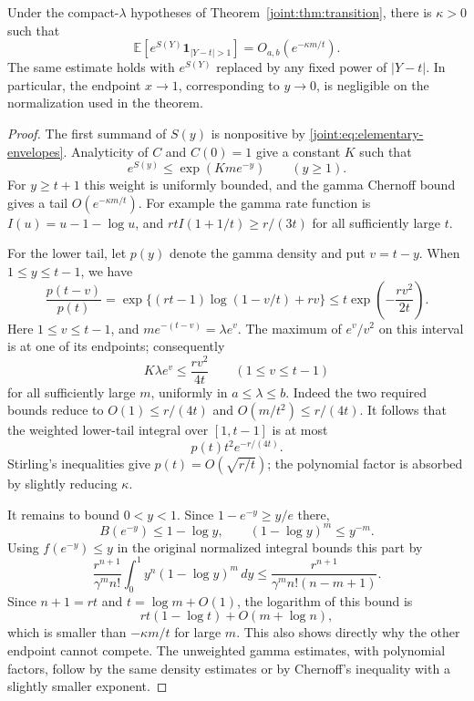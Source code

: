 \begin{lemma}\label{joint:lem:localization}
Under the compact-$\lambda$ hypotheses of
Theorem~\ref{joint:thm:transition}, there is $\kappa>0$ such that
\begin{equation}\label{joint:eq:localization}
 \mathbb E\left[e^{S(Y)}\mathbf1_{|Y-t|>1}\right]
       =O_{a,b}\left(e^{-\kappa m/t}\right).
\end{equation}
The same estimate holds with $e^{S(Y)}$ replaced by any fixed power
of $|Y-t|$. In particular, the endpoint $x\to1$, corresponding to
$y\to0$, is negligible on the normalization used in the theorem.
\end{lemma}
\begin{proof}
The first summand of $S(y)$ is nonpositive by
\eqref{joint:eq:elementary-envelopes}. Analyticity of $C$ and $C(0)=1$
give a constant $K$ such that
\[
 e^{S(y)}\leq\exp(Kme^{-y})\qquad(y\geq1).
\]
For $y\geq t+1$ this weight is uniformly bounded, and the gamma
Chernoff bound gives a tail $O(e^{-\kappa m/t})$.
For example the gamma rate function is $I(u)=u-1-\log u$, and
$rt I(1+1/t)\geq r/(3t)$ for all sufficiently large $t$.

For the lower tail, let $p(y)$ denote the gamma density and put
$v=t-y$. When $1\leq y\leq t-1$, we have
\[
 \frac{p(t-v)}{p(t)}
  =\exp\{(rt-1)\log(1-v/t)+rv\}
  \leq t\exp\left(-\frac{rv^2}{2t}\right).
\]
Here $1\leq v\leq t-1$, and $me^{-(t-v)}=\lambda e^v$.
The maximum of $e^v/v^2$ on this interval is at one of its endpoints;
consequently
\[
 K\lambda e^v\leq\frac{rv^2}{4t}
 \qquad(1\leq v\leq t-1)
\]
for all sufficiently large $m$, uniformly in $a\leq\lambda\leq b$.
Indeed the two required bounds reduce to $O(1)\leq r/(4t)$ and
$O(m/t^2)\leq r/(4t)$. It follows that the weighted lower-tail
integral over $[1,t-1]$ is at most
\[
 p(t)t^2e^{-r/(4t)}.
\]
Stirling's inequalities give $p(t)=O(\sqrt{r/t})$; the polynomial
factor is absorbed by slightly reducing $\kappa$.

It remains to bound $0<y<1$. Since $1-e^{-y}\geq y/e$ there,
\[
 B(e^{-y})\leq1-\log y,
 \qquad (1-\log y)^m\leq y^{-m}.
\]
Using $f(e^{-y})\leq y$ in the original normalized integral bounds
this part by
\begin{equation}\label{joint:eq:opposite-endpoint}
 \frac{r^{n+1}}{\gamma^m n!}
 \int_0^1 y^n(1-\log y)^m\,dy
 \leq\frac{r^{n+1}}{\gamma^m n!(n-m+1)}.
\end{equation}
Since $n+1=rt$ and $t=\log m+O(1)$, the logarithm of this bound is
\[
 rt(1-\log t)+O(m+\log n),
\]
which is smaller than $-\kappa m/t$ for large $m$.
This also shows directly why the other endpoint cannot compete.
The unweighted gamma estimates, with polynomial factors, follow by
the same density estimates or by Chernoff's inequality with a
slightly smaller exponent.
\end{proof}

